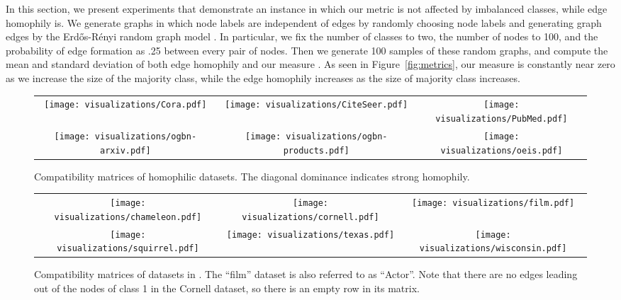 \documentclass[sigconf, balance=false]{acmart}
\begin{document}
In this section, we present experiments that demonstrate an instance in which our metric is not affected by imbalanced classes, while edge homophily is. We generate graphs in which node labels are independent of edges by randomly choosing node labels and generating graph edges by the Erd\H{o}s-R\'enyi random graph model \cite{erdHos1960evolution}. In particular, we fix the number of classes to two, the number of nodes to 100, and the probability of edge formation as .25 between every pair of nodes. Then we generate 100 samples of these random graphs, and compute the mean and standard deviation of both edge homophily  and our measure . As seen in Figure~\ref{fig:metrics}, our measure  is constantly near zero as we increase the size of the majority class, while the edge homophily  increases as the size of majority class increases. 


\begin{figure*}[t]
\centering
\begin{tabular}{ccc}
    \texttt{[image: visualizations/Cora.pdf]} &
    \texttt{[image: visualizations/CiteSeer.pdf]} &
    \texttt{[image: visualizations/PubMed.pdf]} \\
    \texttt{[image: visualizations/ogbn-arxiv.pdf]} &
    \texttt{[image: visualizations/ogbn-products.pdf]} &
    \texttt{[image: visualizations/oeis.pdf]}
\end{tabular}
\caption{Compatibility matrices of homophilic datasets. The diagonal dominance indicates strong homophily.}
\label{fig:compat_homophilic}
\end{figure*}

\begin{figure*}[t]
\centering
\begin{tabular}{ccc}
    \texttt{[image: visualizations/chameleon.pdf]} &
    \texttt{[image: visualizations/cornell.pdf]} &
    \texttt{[image: visualizations/film.pdf]} \\
    \texttt{[image: visualizations/squirrel.pdf]} &
    \texttt{[image: visualizations/texas.pdf]} &
    \texttt{[image: visualizations/wisconsin.pdf]}
\end{tabular}
\caption{Compatibility matrices of datasets in \citet{pei2019geom}. The ``film'' dataset is also referred to as ``Actor''. Note that there are no edges leading out of the nodes of class 1 in the Cornell dataset, so there is an empty row in its matrix.}
\label{fig:compat_geom_gcn}
\end{figure*}
\end{document}
